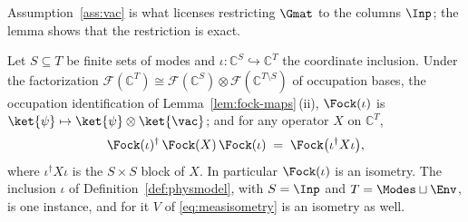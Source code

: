 
Assumption~\ref{ass:vac} is what licenses restricting $\Gmat$ to the columns
$\Inp$; the lemma shows that the restriction is exact.

\begin{lemma}\label{lem:vacelim}
Let $S\subseteq T$ be finite sets of modes and
$\iota:\mathbb{C}^{S}\hookrightarrow\mathbb{C}^{T}$ the coordinate inclusion.
Under the factorization
$\mathcal{F}(\mathbb{C}^{T})\cong\mathcal{F}(\mathbb{C}^{S})\otimes
\mathcal{F}(\mathbb{C}^{T\setminus S})$ of occupation bases, the occupation
identification of Lemma~\ref{lem:fock-maps}\,(ii), $\Fock(\iota)$ is
$\ket{\psi}\mapsto\ket{\psi}\otimes\ket{\vac}$; and for any operator $X$ on
$\mathbb{C}^{T}$,
\begin{equation}\label{eq:vacelim}
  \Fock(\iota)^\dagger\,\Fock(X)\,\Fock(\iota)
  \;=\;\Fock\big(\iota^\dagger X\iota\big),
\end{equation}
where $\iota^\dagger X\iota$ is the $S\times S$ block of $X$. In
particular $\Fock(\iota)$ is an isometry. The inclusion $\iota$ of
Definition~\ref{def:physmodel}, with $S=\Inp$ and $T=\Modes\sqcup\Env$, is
one instance, and for it $V$ of \eqref{eq:measisometry} is an isometry as
well.
\end{lemma}

